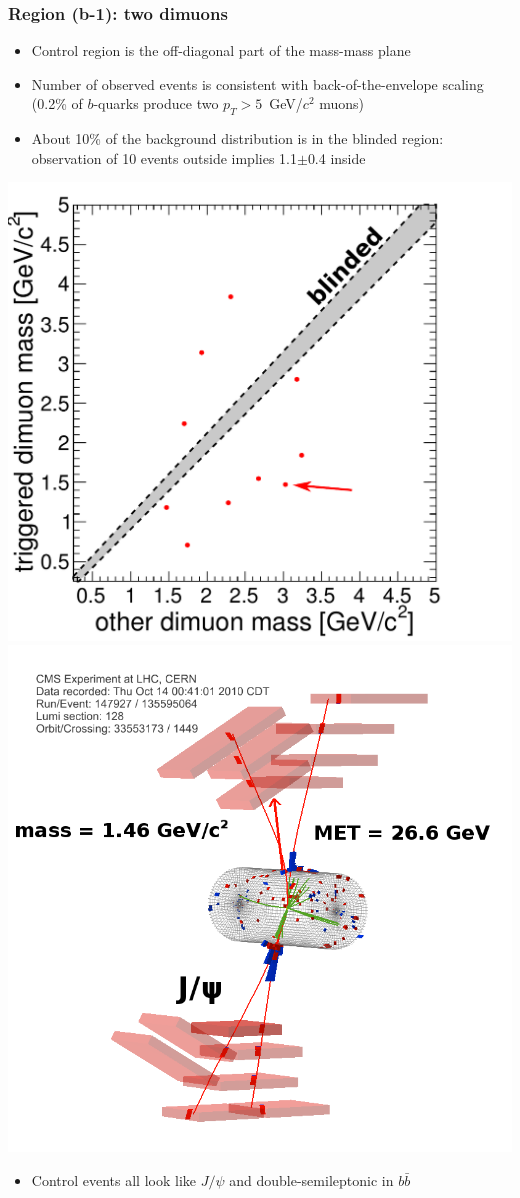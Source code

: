 \documentclass[compress]{beamer}
\begin{document}
\begin{frame}
\frametitle{Region (b-1): two dimuons}

\begin{itemize}
\item Control region is the off-diagonal part of the mass-mass plane
\item Number of observed events is consistent with
  back-of-the-envelope scaling (0.2\% of $b$-quarks produce two
  $p_T > 5$~GeV/$c^2$ muons)
\item About 10\% of the background distribution is in the blinded region:
  observation of 10 events outside implies 1.1$\pm$0.4 inside
\end{itemize}

\vfill
\includegraphics[height=4.9 cm]{data_dimudimu_wholecontrol.pdf} \hfill
\includegraphics[height=4.9 cm]{dimudimu_control_eventdisplay.png}

\begin{itemize}
\item Control events all look like $J/\psi$ and double-semileptonic in $b\bar{b}$
\end{itemize}
\end{frame}
\end{document}

